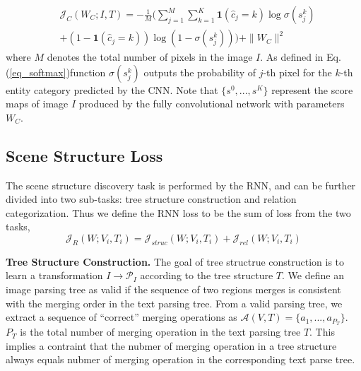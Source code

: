 \documentclass[10pt,twocolumn,letterpaper]{article}
\begin{document}
\iffalse

\fi


\begin{equation}\label{eq_cnn_loss}
\begin{split}
&\mathcal{J}_{C}(W_C;I,T) = -\frac{1}{M}( \sum_{j=1}^M \sum_{k=1}^K \textbf{1}(\widehat{c}_j=k)\log \sigma(s_j^k)\\
& +(1-\textbf{1}(\widehat{c}_j=k))\log(1-\sigma(s_j^k)) ) + \|W_C\|^2
\end{split}
\end{equation}
where $M$ denotes the total number of pixels in the image $I$. As defined in Eq.(\ref{eq_softmax})function $\sigma(s_j^k)$ outputs the probability of $j$-th pixel for the $k$-th entity category predicted by the CNN. Note that $\{s^0,...,s^K\}$ represent the score maps of image $I$ produced by the fully convolutional network with parameters $W_C$.


\subsection{Scene Structure Loss} \label{sub:rnn_loss}
The scene structure discovery task is performed by the RNN, and can be further divided into two sub-tasks: tree structure construction and relation categorization. Thus we define the RNN loss to be the sum of loss from the two tasks,
\begin{equation}\label{eq_rnn_loss}
	\mathcal{J}_{R}(W;V_i,T_i) = \mathcal{J}_{struc}(W;V_i,T_i) + \mathcal{J}_{rel}(W;V_i,T_i)
\end{equation}

\textbf{Tree Structure Construction.}
The goal of tree structrue construction is to learn a transformation $I\rightarrow \mathcal{P}_I$ according to the tree structure $T$. We define an image parsing tree as valid if the sequence of two regions merges is consistent with the merging order in the text parsing tree. From a valid parsing tree, we extract a sequence of ``correct'' merging operations as $\mathcal{A}(V,T)=\{a_1,...,a_{P_T}\}$. $P_T$ is the total number of merging operation in the text parsing tree $T$. This implies a contraint that the nubmer of merging operation in a tree structure always equals nubmer of merging operation in the corresponding text parse tree.
\end{document}
